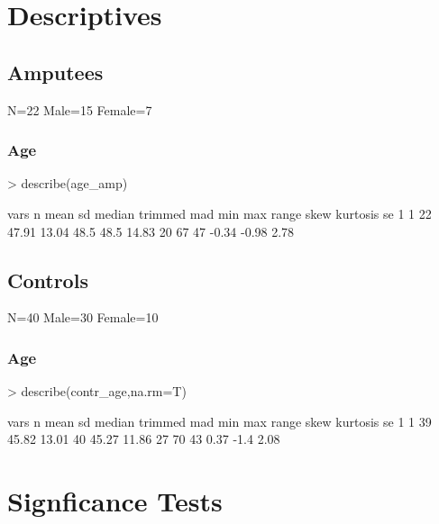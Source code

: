 \documentclass{article}
\begin{document}


\section*{Descriptives}
\subsection*{Amputees}
N=22
Male=15
Female=7
\subsubsection*{Age}
\begin{Schunk}
\begin{Sinput}
> describe(age_amp)
\end{Sinput}
\begin{Soutput}
  vars  n  mean    sd median trimmed   mad min max range  skew kurtosis   se
1    1 22 47.91 13.04   48.5    48.5 14.83  20  67    47 -0.34    -0.98 2.78
\end{Soutput}
\end{Schunk}
\subsection*{Controls}
N=40
Male=30
Female=10
\subsubsection*{Age}
\begin{Schunk}
\begin{Sinput}
> describe(contr_age,na.rm=T)
\end{Sinput}
\begin{Soutput}
  vars  n  mean    sd median trimmed   mad min max range skew kurtosis   se
1    1 39 45.82 13.01     40   45.27 11.86  27  70    43 0.37     -1.4 2.08
\end{Soutput}
\end{Schunk}

\section*{Signficance Tests}
\end{document}
